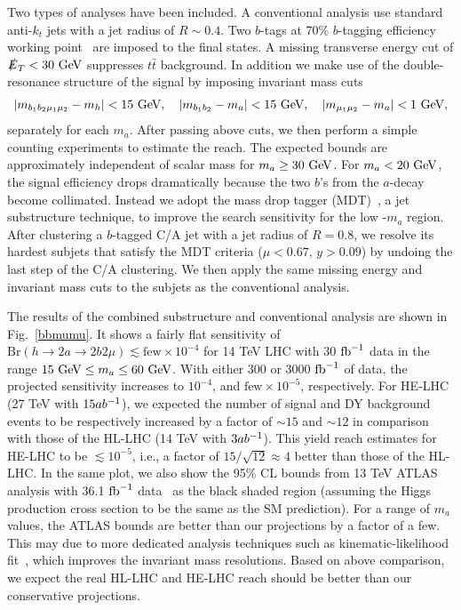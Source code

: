 Two types of analyses have been included. A conventional analysis use standard anti-$k_t$ jets with a jet radius of $R\sim 0.4$. Two $b$-tags at 70\% $b$-tagging efficiency working point~\cite{ATLAS:2014cal}  are imposed to the final states. A missing transverse energy cut of $\slashed{E}_T < 30 ~\text{GeV}$ suppresses $t \bar t$ background. In addition we make use of the double-resonance structure of the signal by imposing invariant mass cuts 
\begin{align}
|m_{b_1 b_2 \mu_1 \mu_2}-m_h|< 15~\text{GeV},\quad |m_{b_1 b_2}-m_a|< 15~\text{GeV},\quad|m_{\mu_1\mu_2}-m_a| < 1~\text{GeV},
\end{align}
separately for each $m_a$. After passing above cuts, we then perform a simple counting experiments to estimate the reach. The expected bounds are approximately independent of scalar mass for $m_a \geq 30 ~\text{GeV}$. For $m_a < 20 ~\text{GeV}$, the signal efficiency drops dramatically because the two $b$'s from the $a$-decay become collimated. Instead we adopt the mass drop tagger (MDT)~\cite{Butterworth:2008sd}, a jet substructure technique, to improve the search sensitivity for the low -$m_a$ region. After clustering a $b$-tagged C/A  jet with a jet radius of $R=0.8$, we resolve its hardest subjets that satisfy the MDT criteria ($\mu < 0.67$, $y>0.09$) by undoing the last step of the C/A clustering. We then apply the same missing energy and invariant mass cuts to the subjets as the conventional analysis.

The results of the combined substructure and conventional analysis are shown in Fig.~\ref{bbmumu}. It shows a fairly flat sensitivity of  $\mathrm{Br}(h \to 2a \to 2b2\mu) \lesssim \text{few}\times10^{-4}$ for 14 TeV LHC with 30 ${\rm fb}^{-1}$ data in the range $15~\text{GeV} \leq m_a \leq 60 ~\text{GeV}$. With either 300 or 3000 ${\rm fb}^{-1}$ of data, the projected sensitivity increases to  $10^{-4}$, and $\text{few}\times 10^{-5}$, respectively. For HE-LHC (27 TeV with $15ab^{-1}$), we expected the number of signal and DY background events to be respectively increased by a factor of $\sim15$ and $\sim12$ in comparison with those of the HL-LHC (14 TeV with $3ab^{-1}$). This yield reach estimates for HE-LHC to be 
$\lesssim 10^{-5}$, i.e., a factor of $15/\sqrt{12}\approx 4$ better than those of the HL-LHC. In the same plot, we also show the 95\% CL bounds from 13 TeV ATLAS analysis with 36.1 ${\rm fb}^{-1}$ data~\cite{Aaboud:2018esj} as the black shaded region (assuming the Higgs production cross section to be the same as the SM prediction). For a range of $m_a$ values, the ATLAS bounds are better than our projections  by a factor of a few. This may due to more dedicated analysis techniques such as kinematic-likelihood fit~\cite{Aaboud:2018esj}, which improves the invariant mass resolutions. Based on above comparison, we expect the real HL-LHC and HE-LHC reach should be better than our conservative projections. 



